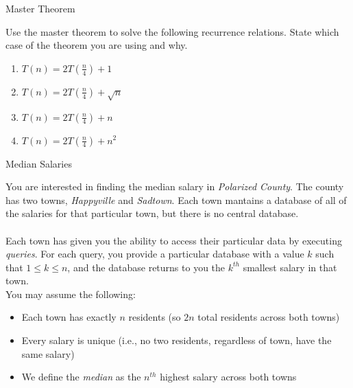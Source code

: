 \documentclass[10pt]{article}
\begin{document}
\thispagestyle{empty}
\handout


\begin{problem} Master Theorem \end{problem}

Use the master theorem to solve the following recurrence relations. State which case of the theorem you are using and why.

\begin{enumerate}

  \item $T(n)=2T(\frac{n}{4})+1$

\solution{
}


  \item $T(n)=2T(\frac{n}{4})+\sqrt{n}$

\solution{
}


  \item $T(n)=2T(\frac{n}{4})+n$

\solution{
}


  \item $T(n)=2T(\frac{n}{4})+n^2$

\solution{
}


\end{enumerate}




\begin{problem} Median Salaries \end{problem}

You are interested in finding the median salary in \emph{Polarized County}. The county has two towns, \emph{Happyville} and \emph{Sadtown}. Each town mantains a database of all of the salaries for that particular town, but there is no central database.\\
\\
Each town has given you the ability to access their particular data by executing \emph{queries}. For each query, you provide a particular database with a value $k$ such that $1 \leq k \leq n$, and the database returns to you the $k^{th}$ smallest salary in that town.
\\
You may assume the following:

\begin{itemize}
\item Each town has exactly $n$ residents (so $2n$ total residents across both towns)
\item Every salary is unique (i.e., no two residents, regardless of town, have the same salary) 
\item We define the \emph{median} as the $n^{th}$ highest salary across both towns
\end{itemize}
\end{document}
